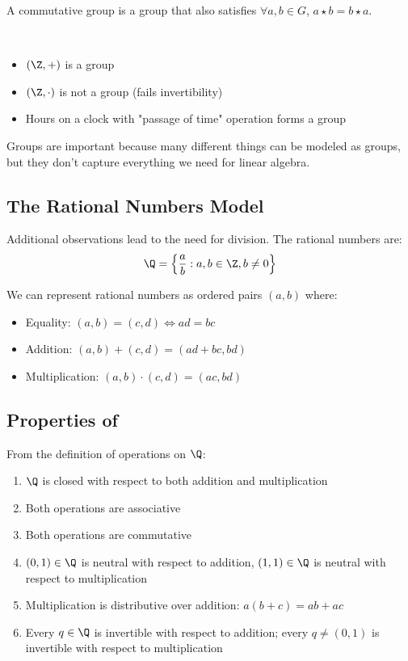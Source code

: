 \begin{definition}\label{def:commutative-group}
    A commutative group is a group that also satisfies $\forall a, b \in G$, $a \star b = b \star a$.
\end{definition}

\begin{eg}\
    \begin{itemize}
        \item $(\Z, +)$ is a group
        \item $(\Z, \cdot)$ is not a group (fails invertibility)
        \item Hours on a clock with "passage of time" operation forms a group
    \end{itemize}
\end{eg}

Groups are important because many different things can be modeled as groups, but they don't capture everything we need for linear algebra.

\subsection{The Rational Numbers Model}

Additional observations lead to the need for division. The rational numbers are:
\[
    \Q = \left\{\frac{a}{b} : a, b \in \Z, b \neq 0\right\}
\]

We can represent rational numbers as ordered pairs $(a,b)$ where:
\begin{itemize}
    \item Equality: $(a,b) = (c,d) \iff ad = bc$
    \item Addition: $(a,b) + (c,d) = (ad + bc, bd)$
    \item Multiplication: $(a,b) \cdot (c,d) = (ac, bd)$
\end{itemize}

\subsection{Properties of \Q}

From the definition of operations on $\Q$:
\begin{enumerate}[label=(\roman*)]
    \item $\Q$ is closed with respect to both addition and multiplication
    \item Both operations are associative
    \item Both operations are commutative
    \item $(0,1) \in \Q$ is neutral with respect to addition, $(1,1) \in \Q$ is neutral with respect to multiplication
    \item Multiplication is distributive over addition: $a(b + c) = ab + ac$
    \item Every $q \in \Q$ is invertible with respect to addition; every $q \neq (0,1)$ is invertible with respect to multiplication
\end{enumerate}

